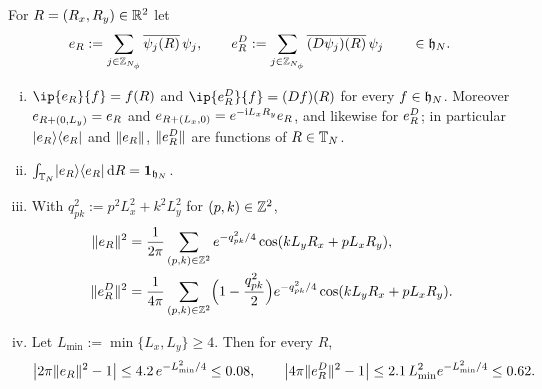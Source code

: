 \begin{lemma}\label{lem:evaluation}
For $R=(R_x,R_y)\in\mathbb{R}^2$ let
\[
e_{R}:=\sum_{j\in\mathbb{Z}_{N_{\phi}}}\overline{\psi_j(R)}\,\psi_j,\qquad
e^{D}_{R}:=\sum_{j\in\mathbb{Z}_{N_{\phi}}}\overline{(D\psi_j)(R)}\,\psi_j\qquad\in\mathfrak{h}_N .
\]
\begin{enumerate}[(i)]
\item $\ip{\ev R}{f}=f(R)$ and $\ip{\evD R}{f}=(Df)(R)$ for every $f\in\mathfrak{h}_N$. Moreover
$e_{R+(0,L_y)}=e_{R}$ and $e_{R+(L_x,0)}=e^{-\mathrm{i} L_xR_y}e_{R}$, and likewise for $e^{D}_{R}$; in particular
$\lvert e_{R}\rangle\langle e_{R}\rvert$ and $\lVert e_{R}\rVert$, $\lVert e^{D}_{R}\rVert$ are functions of $R\in\mathbb{T}_N$.
\item $\int_{\mathbb{T}_N}\lvert e_{R}\rangle\langle e_{R}\rvert\,\mathrm{d} R=\mathbf{1}_{\mathfrak{h}_N}$.
\item With $q_{pk}^2:=p^2L_x^2+k^2L_y^2$ for $(p,k)\in\mathbb{Z}^2$,
\begin{align*}
\lVert e_{R}\rVert^2&=\frac1{2\pi}\sum_{(p,k)\in\mathbb{Z}^2}e^{-q_{pk}^2/4}\cos(kL_yR_x+pL_xR_y),\\
\lVert e^{D}_{R}\rVert^2&=\frac1{4\pi}\sum_{(p,k)\in\mathbb{Z}^2}\Bigl(1-\frac{q_{pk}^2}2\Bigr)e^{-q_{pk}^2/4}\cos(kL_yR_x+pL_xR_y).
\end{align*}
\item Let $L_{\min}:=\min\{L_x,L_y\}\ge4$. Then for every $R$,
\[
\bigl\lvert2\pi\lVert e_{R}\rVert^2-1\bigr\rvert\le4.2\,e^{-L_{\min}^2/4}\le0.08,\qquad
\bigl\lvert4\pi\lVert e^{D}_{R}\rVert^2-1\bigr\rvert\le2.1\,L_{\min}^2e^{-L_{\min}^2/4}\le0.62 .
\]
\end{enumerate}
\end{lemma}

